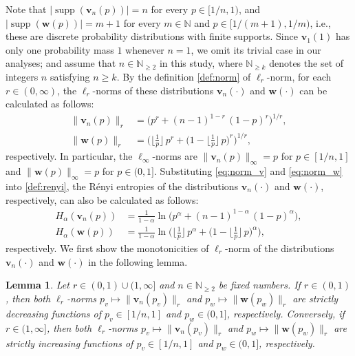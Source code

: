\documentclass[conference, draftcls, onecolumn]{IEEEtran}
\theoremstyle{plain}
\newtheorem{lemma}{Lemma}
\newcommand{\bvec}[1]{\boldsymbol{#1}}
\newcommand{\supp}{\operatorname{supp}}
\begin{document}
Note that $| \! \supp( \bvec{v}_{n}( p ) ) | = n$ for every $p \in [1/n, 1)$, and $| \! \supp( \bvec{w}( p ) )| = m+1$ for every $m \in \mathbb{N}$ and $p \in [1/(m+1), 1/m)$, i.e., these are discrete probability distributions with finite supports.
Since $\bvec{v}_{1}( 1 )$ has only one probability mass $1$ whenever $n = 1$, we omit its trivial case in our analyses; and assume that $n \in \mathbb{N}_{\ge 2}$ in this study, where $\mathbb{N}_{\ge k}$ denotes the set of integers $n$ satisfying $n \ge k$.
By the definition \eqref{def:norm} of $\ell_{r}$-norm, for each $r \in (0, \infty)$, the $\ell_{r}$-norms of these distributions $\bvec{v}_{n}( \cdot )$ and $\bvec{w}( \cdot )$ can be calculated as follows:
\begin{align}
\| \bvec{v}_{n}( p ) \|_{r}
& =
\Big( p^{r} + (n-1)^{1-r} \, (1-p)^{r} \Big)^{1/r} ,
\label{eq:norm_v} \\
\| \bvec{w}( p ) \|_{r}
& =
\bigg( \bigg\lfloor \frac{1}{p} \bigg\rfloor \, p^{r} + \bigg( 1 - \bigg\lfloor \frac{1}{p} \bigg\rfloor \, p \bigg)^{r} \bigg)^{1/r} ,
\label{eq:norm_w}
\end{align}
respectively.
In particular, the $\ell_{\infty}$-norms are $\| \bvec{v}_{n}( p ) \|_{\infty} = p$ for $p \in [1/n, 1]$ and $\| \bvec{w}( p ) \|_{\infty} = p$ for $p \in (0, 1]$.
Substituting \eqref{eq:norm_v} and \eqref{eq:norm_w} into \eqref{def:renyi}, the R\'{e}nyi entropies of the distributions $\bvec{v}_{n}( \cdot )$ and $\bvec{w}( \cdot )$, respectively, can also be calculated as follows:
\begin{align}
H_{\alpha}( \bvec{v}_{n}( p ) )
& =
\frac{ 1 }{ 1 - \alpha } \ln \Big( p^{\alpha} + (n-1)^{1-\alpha} \, (1-p)^{\alpha} \Big) ,
\\
H_{\alpha}( \bvec{w}( p ) )
& =
\frac{ 1 }{ 1 - \alpha } \ln \bigg( \bigg\lfloor \frac{1}{p} \bigg\rfloor \, p^{\alpha} + \bigg( 1 - \bigg\lfloor \frac{1}{p} \bigg\rfloor \, p \bigg)^{\alpha} \bigg) ,
\end{align}
respectively.
We first show the monotonicities of $\ell_{r}$-norm of the distributions $\bvec{v}_{n}( \cdot )$ and $\bvec{w}( \cdot )$ in the following lemma.



\begin{lemma}
\label{lem:mono}
Let $r \in (0, 1) \cup (1, \infty]$ and $n \in \mathbb{N}_{\ge 2}$ be fixed numbers.
If $r \in (0, 1)$, then both $\ell_{r}$-norms $p_{v} \mapsto \| \bvec{v}_{n}( p_{v} ) \|_{r}$ and $p_{w} \mapsto \| \bvec{w}( p_{w} ) \|_{r}$ are strictly decreasing functions of $p_{v} \in [1/n, 1]$ and $p_{w} \in (0, 1]$, respectively.
Conversely, if $r \in (1, \infty]$, then both $\ell_{r}$-norms $p_{v} \mapsto \| \bvec{v}_{n}( p_{v} ) \|_{r}$ and $p_{w} \mapsto \| \bvec{w}( p_{w} ) \|_{r}$ are strictly increasing functions of $p_{v} \in [1/n, 1]$ and $p_{w} \in (0, 1]$, respectively.
\end{lemma}
\end{document}

